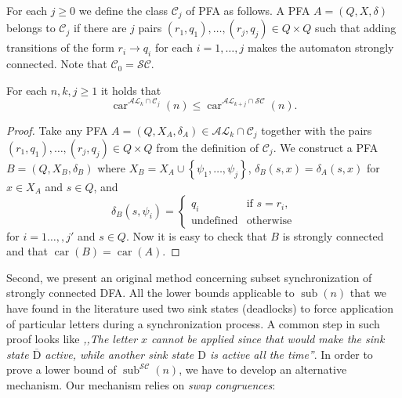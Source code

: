 \documentclass{ws-ijmpc}
\DeclareMathOperator{\car}{car}
\DeclareMathOperator{\sub}{sub}
\DeclareMathOperator{\und}{\mbox{undefined}}
\begin{document}
For each $j\ge0$ we define the class $\mathcal{C}_{j}$ of PFA as
follows. A PFA $A=\left(Q,X,\delta\right)$ belongs to $\mathcal{C}_{j}$
if there are $j$ pairs $\left(r_{1},q_{1}\right),\dots,\left(r_{j},q_{j}\right)\in Q\times Q$
such that adding transitions of the form $r_{i}\longrightarrow q_{i}$
for each $i=1,\dots,j$ makes the automaton strongly connected. Note
that $\mathcal{C}_{0}=\mathcal{SC}$.
\begin{lemma}
\label{lem: car sc}For each $n,k,j\ge1$ it holds that
\[
\car^{\mathcal{AL}_{k}\cap\mathcal{C}_{j}}\!\left(n\right)\le\car^{\mathcal{AL}_{k+j}\cap\mathcal{SC}}\!\left(n\right).
\]
\end{lemma}
\begin{proof}
Take any PFA $A=\left(Q,X_{A},\delta_{A}\right)\in\mathcal{AL}_{k}\cap\mathcal{C}_{j}$
together with the pairs $\left(r_{1},q_{1}\right),\dots,\left(r_{j},q_{j}\right)\in Q\times Q$
from the definition of $\mathcal{C}_{j}$. We construct a PFA $B=\left(Q,X_{B},\delta_{B}\right)$
where $X_{B}=X_{A}\cup\left\{ \psi_{1},\dots,\psi_{j}\right\} $,
$\delta_{B}\!\left(s,x\right)=\delta_{A}\!\left(s,x\right)$ for $x\in X_{A}$
and $s\in Q$, and
\[
\delta_{B}\!\left(s,\psi_{i}\right)=\begin{cases}
q_{i} & \mbox{if }s=r_{i},\\
\und & \mbox{otherwise}
\end{cases}
\]
for $i=1\dots,,j'$ and $s\in Q$. Now it is easy to check that $B$
is strongly connected and that $\car\!\left(B\right)=\car\!\left(A\right)$.
\end{proof}
Second, we present an original method concerning subset synchronization
of strongly connected DFA. All the lower bounds applicable to $\sub\!\left(n\right)$
that we have found in the literature used two sink states (deadlocks)
to force application of particular letters during a synchronization
process. A common step in such proof looks like \emph{,,The letter
$x$ cannot be applied since that would make the sink state $\overline{\mathrm{D}}$
active, while another sink state $\mathrm{D}$ is active all the time''}.
In order to prove a lower bound of $\sub^{\mathcal{SC}}\!\left(n\right)$,
we have to develop an alternative mechanism. Our mechanism relies
on \emph{swap congruences}:
\end{document}
